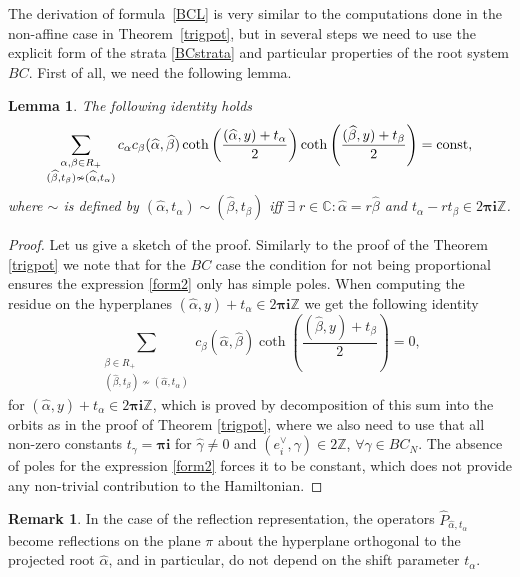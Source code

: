 \documentclass[12pt]{amsart}
\numberwithin{equation}{section}
\newtheorem{lemma}[theorem]{Lemma}
\theoremstyle{definition}
\newtheorem{remark}[theorem]{Remark}
\begin{document}
The derivation of formula~\eqref{BCL} is very similar to the computations done in the non-affine case in Theorem~\ref{trigpot}, but in several steps we %
need to use the explicit form of the strata \eqref{BCstrata} and particular properties of the root system $BC$. First of all, we need the following lemma.
\begin{lemma}
    The following identity holds
    \begin{equation}
    \label{form2}
    \sum_{\substack{\alpha, \beta  \in R_+ \\  (\widehat{\beta}, t_{\beta}) \nsim (\widehat{\alpha}, t_{\alpha})}} c_{\alpha} c_{\beta} (\widehat{\alpha}, \widehat{\beta}) \coth\left(\frac{(\widehat{\alpha}, y) + t_{\alpha}}{2}\right) \coth\left(\frac{(\widehat{\beta}, y) + t_{\beta}}{2}\right) = \rm{const},
    \end{equation}
    where $\sim$ is defined by $(\widehat{\alpha}, t_{\alpha}) \sim (\widehat{\beta}, t_{\beta})$ iff $\exists \; r \in \mathbb{C}: \widehat{\alpha} = r \widehat{\beta}$ and $t_{\alpha} - r t_{\beta} \in 2 \boldsymbol{\pi} \boldsymbol{i} \mathbb{Z}$.
\end{lemma}
\begin{proof}
    Let us give a sketch of the proof. Similarly to the proof of the Theorem \ref{trigpot} we note that for the $BC$ case the condition for not being proportional ensures the expression \eqref{form2} only has simple poles. When computing the residue on the hyperplanes $(\widehat{\alpha}, y ) + t_{\alpha} \in 2 \boldsymbol{\pi} \boldsymbol{i} \mathbb{Z}$ we get the following identity
    \begin{equation*}
    \sum\limits_{\substack{\beta \in R_+ \\ (\widehat{\beta}, t_{\beta}) \nsim (\widehat{\alpha}, t_{\alpha})}} 
    c_{\beta} (\widehat{\alpha},\widehat{\beta}) \coth\left(\frac{(\widehat{\beta}, y) + t_{\beta}}{2}\right) = 0,
    \end{equation*}
    for $(\widehat{\alpha}, y ) + t_{\alpha} \in 2 \boldsymbol{\pi} \boldsymbol{i} \mathbb{Z}$, which is proved by decomposition of this sum into the orbits as in the proof of Theorem \ref{trigpot}, where we also need to use that all non-zero constants $t_{\gamma} = \boldsymbol{\pi} \boldsymbol{i}$ for $\widehat{\gamma} \neq 0$ and $(e_i^{\vee}, \gamma) \in 2  \mathbb{Z}$, $\forall \gamma \in BC_N$. The absence of poles for the expression \eqref{form2} forces it to be constant, which does not provide any non-trivial contribution to the Hamiltonian. 
\end{proof}
\begin{remark}
    In the case of the reflection representation, the operators $\widehat{P}_{\widehat{\alpha}, t_{\alpha}}$ become reflections on the plane $\pi$ about the hyperplane orthogonal to the projected root $\widehat{\alpha}$, and in particular, do not depend on the shift parameter $t_{\alpha}$.
\end{remark}
\end{document}
